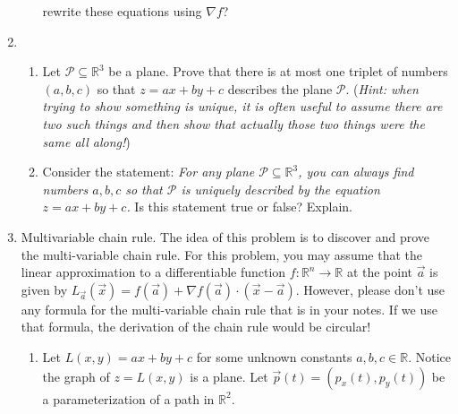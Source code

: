 \documentclass[letter]{article}
\newcommand{\R}{\mathbb{R}}
\begin{document}
\begin{enumerate}
\begin{enumerate}
				rewrite these equations using $\nabla f$?
		\end{enumerate}
		\item \begin{enumerate}
			\item Let $\mathcal P\subseteq \R^3$ be a plane. Prove that there is at most one triplet
			of numbers $(a,b,c)$ so that $z=ax+by+c$ describes the plane $\mathcal P$.  
			(\emph{Hint: when trying to show something is unique, it is often useful to 
			assume there are two such things and then show that actually those two things were the
			same all along!})
			\item Consider the statement: \emph{For any plane $\mathcal P\subseteq \R^3$, you can always find numbers
				$a,b,c$ so that $\mathcal P$ is uniquely described by the equation $z=ax+by+c$.}
				Is this statement true or false?  Explain.
		\end{enumerate}
		\item {\sc Multivariable chain rule}.
			The idea of this problem is to discover and prove the multi-variable chain rule.
			For this problem, you may assume that the linear approximation to a differentiable 
			function $f:\R^n\to\R$
			at the point $\vec a$ is given by $L_{\vec a}(\vec x)=f(\vec a)+\nabla f(\vec a)\cdot (\vec x-\vec a)$.  However,
			please don't use any formula for the multi-variable chain rule that is in your notes. If
			we use that formula, the derivation of the chain rule would be circular!
			\begin{enumerate}
				\item Let $L(x,y)=ax+by+c$ for some unknown constants $a,b,c\in\R$.  Notice
					the graph of $z=L(x,y)$ is a plane.  Let $\vec p(t) = (p_x(t), p_y(t))$
					be a parameterization of a path in $\R^2$.


\end{enumerate}
\end{enumerate}
\end{document}
